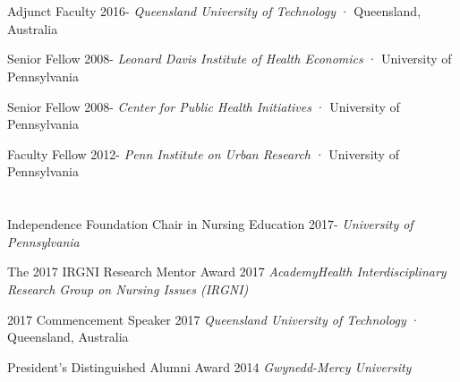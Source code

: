 \documentclass[10pt,]{article}
\begin{document}
{{{{{\section{\Large {}}

Adjunct Faculty \hfill {2016-{\small{}}} \newline
\hspace*{0.5cm} {\textit {Queensland University of Technology}} · Queensland, Australia

Senior Fellow  \hfill {2008-{\small{}}} \newline
\hspace*{0.5cm} {\textit {Leonard Davis Institute of Health Economics}} · University of Pennsylvania

Senior Fellow  \hfill {2008-{\small{}}} \newline
\hspace*{0.5cm} {\textit {Center for Public Health Initiatives}} · University of Pennsylvania

Faculty Fellow  \hfill {2012-{\small{}}} \newline
\hspace*{0.5cm} {\textit {Penn Institute on Urban Research}} · University of Pennsylvania \newline

\section{\Large {}}

Independence Foundation Chair in Nursing Education \hfill {2017-{\small{}}} \newline
\hspace*{0.5cm} {\textit {University of Pennsylvania}}

The 2017 IRGNI Research Mentor Award  \hfill 2017	\newline
\hspace*{0.5cm} {\textit {AcademyHealth Interdisciplinary Research Group on Nursing Issues (IRGNI)}} 

2017 Commencement Speaker \hfill 2017	\newline
\hspace*{0.5cm} {\textit {Queensland University of Technology}} · Queensland, Australia

President's Distinguished Alumni Award \hfill 2014 \newline
\hspace*{0.5cm} {\textit {Gwynedd-Mercy University}}

}}}}}
\end{document}
